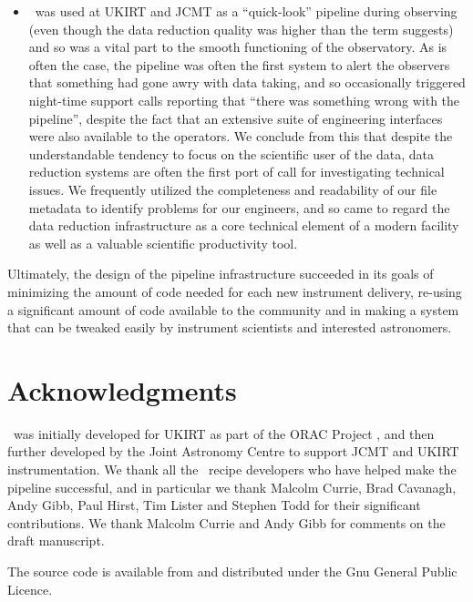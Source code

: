 \documentclass[final,authoryear,5p,times,twocolumn]{elsarticle}
\begin{document}
\begin{itemize}
\item \oracdr\ was used at UKIRT and JCMT as a ``quick-look'' pipeline
  during observing (even though the data reduction quality was higher
  than the term suggests) and so was a vital part to the smooth
  functioning of the observatory. As is often the case, the pipeline
  was often the first system to alert the observers that something had
  gone awry with data taking, and so occasionally triggered night-time
  support calls reporting that ``there was something wrong with the
  pipeline'', despite the fact that an extensive suite of engineering
  interfaces were also available to the operators. We conclude from
  this that despite the understandable tendency to focus on the
  scientific user of the data, data reduction systems are often the
  first port of call for investigating technical issues. We frequently
  utilized the completeness and readability of our file metadata to
  identify problems for our engineers, and so came to regard the data
  reduction infrastructure as a core technical element of a modern
  facility as well as a valuable scientific productivity tool.

\end{itemize}

Ultimately, the design of the pipeline infrastructure succeeded in its
goals of minimizing the amount of code needed for each new instrument
delivery, re-using a significant amount of code available to the
community and in making a system that can be tweaked easily by
instrument scientists and interested astronomers.


\section*{Acknowledgments}

\oracdr\ was initially developed for UKIRT as part of the ORAC Project
\citep{1998SPIE.3349..184B}, and then further developed by the Joint
Astronomy Centre to support JCMT and UKIRT instrumentation. We thank
all the \oracdr\ recipe developers who have helped make the pipeline
successful, and in particular we thank  Malcolm Currie, Brad Cavanagh,
Andy Gibb, Paul Hirst,  Tim Lister and Stephen Todd for their
significant contributions. We thank Malcolm Currie and Andy Gibb for
comments on the draft manuscript.

The source
code is available from
and distributed under the Gnu General Public Licence.
\end{document}
